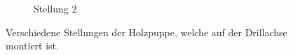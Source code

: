 \begin{figure}
\begin{subfigure}{0.48\textwidth}
        \caption{Stellung 2}
        \label{fig:D_Holzpuppe2}
    \end{subfigure}    
    \caption{Verschiedene Stellungen der Holzpuppe, welche auf der Drillachse montiert ist.}
    \label{fig:D_subfig}
\end{figure}